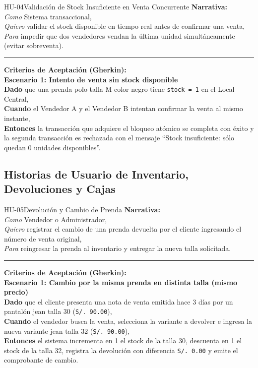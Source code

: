 \begin{hubox}{HU-04}{Validación de Stock Insuficiente en Venta Concurrente}
\textbf{Narrativa:}\\
\textit{Como} Sistema transaccional,\\
\textit{Quiero} validar el stock disponible en tiempo real antes de confirmar una venta,\\
\textit{Para} impedir que dos vendedores vendan la última unidad simultáneamente (evitar sobreventa).

\vspace{0.25cm}\hrule\vspace{0.25cm}
\textbf{Criterios de Aceptación (Gherkin):}\\
\textbf{Escenario 1: Intento de venta sin stock disponible}\\
\textbf{Dado} que una prenda polo talla M color negro tiene \texttt{stock = 1} en el Local Central,\\
\textbf{Cuando} el Vendedor A y el Vendedor B intentan confirmar la venta al mismo instante,\\
\textbf{Entonces} la transacción que adquiere el bloqueo atómico se completa con éxito y la segunda transacción es rechazada con el mensaje ``Stock insuficiente: sólo quedan 0 unidades disponibles''.
\end{hubox}

\subsection{Historias de Usuario de Inventario, Devoluciones y Cajas}

\begin{hubox}{HU-05}{Devolución y Cambio de Prenda}
\textbf{Narrativa:}\\
\textit{Como} Vendedor o Administrador,\\
\textit{Quiero} registrar el cambio de una prenda devuelta por el cliente ingresando el número de venta original,\\
\textit{Para} reingresar la prenda al inventario y entregar la nueva talla solicitada.

\vspace{0.25cm}\hrule\vspace{0.25cm}
\textbf{Criterios de Aceptación (Gherkin):}\\
\textbf{Escenario 1: Cambio por la misma prenda en distinta talla (mismo precio)}\\
\textbf{Dado} que el cliente presenta una nota de venta emitida hace 3 días por un pantalón jean talla 30 (\texttt{S/. 90.00}),\\
\textbf{Cuando} el vendedor busca la venta, selecciona la variante a devolver e ingresa la nueva variante jean talla 32 (\texttt{S/. 90.00}),\\
\textbf{Entonces} el sistema incrementa en 1 el stock de la talla 30, descuenta en 1 el stock de la talla 32, registra la devolución con diferencia \texttt{S/. 0.00} y emite el comprobante de cambio.
\end{hubox}

